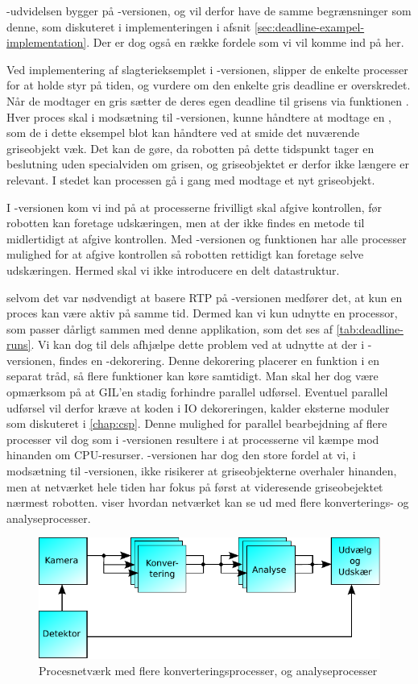-udvidelsen bygger på -versionen, og vil derfor have de samme begrænsninger som denne, som diskuteret i implementeringen i afsnit \cref{sec:deadline-exampel-implementation}. Der er dog også en række fordele som vi vil komme ind på her.

Ved implementering af slagterieksemplet i -versionen, slipper de enkelte processer for at holde styr på tiden, og vurdere om den enkelte gris deadline er overskredet. Når de modtager en gris sætter de deres egen deadline til grisens via funktionen . Hver proces skal i modsætning til -versionen, kunne håndtere at modtage en , som de i dette eksempel blot kan håndtere ved at smide det nuværende griseobjekt væk. Det kan de gøre, da robotten på dette tidspunkt tager en beslutning uden specialviden om grisen, og griseobjektet er derfor ikke længere er relevant. I stedet kan processen  gå i gang med modtage et nyt griseobjekt.

I -versionen kom vi ind på at processerne frivilligt skal afgive kontrollen, før robotten kan foretage udskæringen, men at der ikke findes en metode til midlertidigt at afgive kontrollen. Med -versionen og funktionen  har alle processer mulighed for at afgive kontrollen så robotten rettidigt kan foretage selve udskæringen. Hermed skal vi ikke introducere en delt datastruktur.
  
selvom det var nødvendigt at basere RTP på  -versionen medfører det, at kun en proces kan være aktiv på samme tid. Dermed kan vi kun udnytte en processor, som  passer dårligt sammen med denne applikation, som det ses af \cref{tab:deadline-runs}.  Vi kan dog til dels afhjælpe dette problem ved at udnytte at der i -versionen, findes en -dekorering. Denne dekorering placerer en funktion i en separat tråd, så flere funktioner kan køre samtidigt. Man skal her dog være opmærksom på at GIL'en stadig forhindre parallel udførsel. Eventuel parallel udførsel vil derfor kræve at koden i IO dekoreringen, kalder eksterne moduler som diskuteret i \cref{chap:csp}. Denne mulighed for parallel bearbejdning af flere processer vil dog  som i -versionen resultere i at processerne vil kæmpe mod hinanden om CPU-resurser. -versionen har dog den store fordel at vi, i modsætning til -versionen, ikke risikerer at griseobjekterne overhaler hinanden, men at netværket hele tiden har fokus på først at videresende griseobejektet nærmest robotten.  viser hvordan netværket kan se ud med flere konverterings- og analyseprocesser.

\begin{figure}
 \begin{center}
  \includegraphics[scale=1]{images/pig-network3}
	\caption{Procesnetværk med flere konverteringsprocesser, og analyseprocesser}
	\label{fig:pig-network3}
\end{center}
\end{figure}
